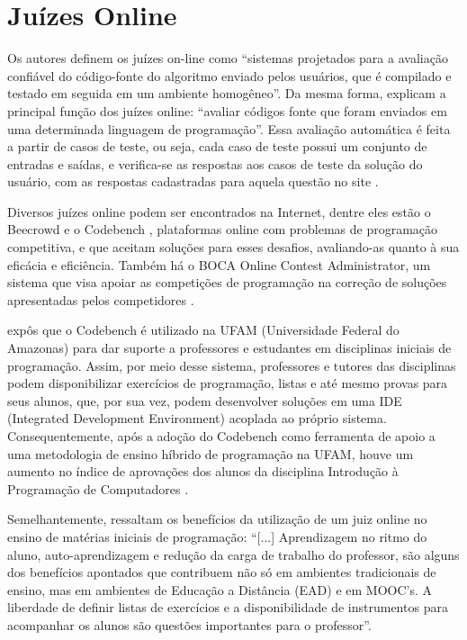 \section{Juízes Online}
Os autores \textcite{wasik} definem os juízes on-line como “sistemas projetados para a avaliação confiável do código-fonte do algoritmo enviado pelos usuários, que é compilado e testado em seguida em um ambiente homogêneo”. Da mesma forma, \textcite[p.~1]{santosribeiro} explicam a principal função dos juízes online: “avaliar códigos fonte que foram enviados em uma determinada linguagem de programação”. Essa avaliação automática é feita a partir de casos de teste, ou seja, cada caso de teste possui um conjunto de entradas e saídas, e verifica-se as respostas aos casos de teste da solução do usuário, com as respostas cadastradas para aquela questão no site \cite[p.~12]{franciscojuniorambrosio}. 

Diversos juízes online podem ser encontrados na Internet, dentre eles estão o Beecrowd \cite{cruz2022} e o Codebench \cite[p.~806]{ribeirofernandescarvalho}, plataformas online com problemas de programação competitiva, e que aceitam soluções para esses desafios, avaliando-as quanto à sua eficácia e eficiência. Também há o BOCA Online Contest Administrator, um sistema que visa apoiar as competições de programação na correção de soluções apresentadas pelos competidores \cite{camposferreira}. 

\textcite[p.~807-808]{ribeirofernandescarvalho} expôs que o Codebench é utilizado na UFAM (Universidade Federal do Amazonas) para dar suporte a professores e estudantes em disciplinas iniciais de programação. Assim, por meio desse sistema, professores e tutores das disciplinas podem disponibilizar exercícios de programação, listas e até mesmo provas para seus alunos, que, por sua vez, podem desenvolver soluções em uma IDE (Integrated Development Environment) acoplada ao próprio sistema. Consequentemente, após a adoção do Codebench como ferramenta de apoio a uma metodologia de ensino híbrido de programação na UFAM, houve um aumento no índice de aprovações dos alunos da disciplina Introdução à Programação de Computadores \cite[p.~148-149]{galvaofernandesgadelha}.

Semelhantemente, \textcite[p.~18-19]{franciscojuniorambrosio} ressaltam os benefícios da utilização de um juiz online no ensino de matérias iniciais de programação: “[...] Aprendizagem no ritmo do aluno, auto-aprendizagem e redução da carga de trabalho do professor, são alguns dos benefícios apontados que contribuem não só em ambientes tradicionais de ensino, mas em ambientes de Educação a Distância (EAD) e em MOOC’s. A liberdade de definir listas de exercícios e a disponibilidade de instrumentos para acompanhar os alunos são questões importantes para o professor”.

